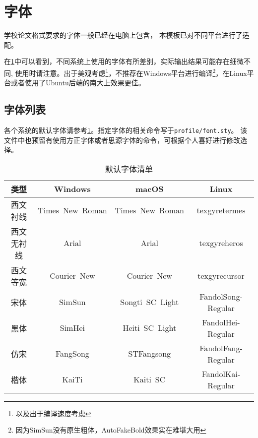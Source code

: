 \section{字体}

学校论文格式要求的字体一般已经在电脑上包含，
本模板已对不同平台进行了适配。

在\cref{tab:fontset}中可以看到，不同系统上使用的字体有所差别，实际输出结果可能存在细微不同, 使用时请注意。出于美观考虑\footnote{以及出于编译速度考虑}，不推荐在Windows平台进行编译\footnote{因为SimSun没有原生粗体，AutoFakeBold效果实在难堪大用}，在Linux平台或者使用了Ubuntu后端的南大上效果更佳。

    
       



\subsection{字体列表}

各个系统的默认字体请参考\cref{tab:fontset}。指定字体的相关命令写于\texttt{profile/font.sty}。
该文件中也预留有使用方正字体或者思源字体的命令，可根据个人喜好进行修改选择。

\begin{table}[htbp]
    \caption{默认字体清单}
    \label{tab:fontset}
    \begin{tabular}{cccc}
        \toprule
        类型 & Windows & macOS & Linux \\
        \midrule
        西文衬线 & Times~New~Roman & Times~New~Roman & texgyretermes \\
        西文无衬线 & Arial & Arial & texgyreheros \\
        西文等宽 & Courier~New & Courier~New & texgyrecursor \\
        宋体 & SimSun & Songti~SC~Light &FandolSong-Regular \\
        黑体 & SimHei & Heiti~SC~Light & FandolHei-Regular \\
        仿宋 & FangSong & STFangsong & FandolFang-Regular \\
        楷体 & KaiTi & Kaiti~SC & FandolKai-Regular \\
        \bottomrule
    \end{tabular}
\end{table}

